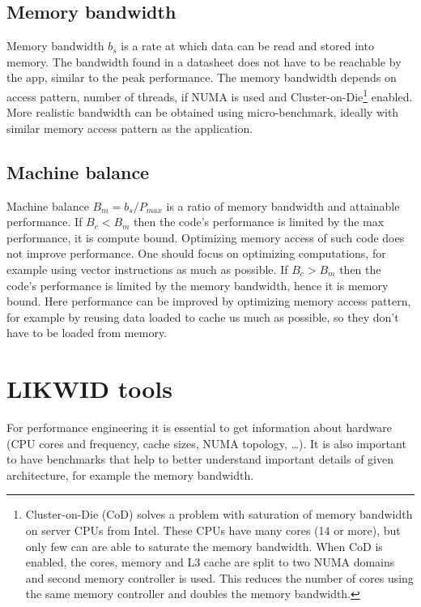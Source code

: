 {\subsection*{Memory bandwidth}

Memory bandwidth $b_s$ is a rate at which data can be read and stored into memory.
The bandwidth found in a datasheet does not have to be reachable by the app, similar to the peak performance.
The memory bandwidth depends on access pattern, number of threads, if NUMA is used and Cluster-on-Die\footnote{Cluster-on-Die (CoD) solves a problem with saturation of memory bandwidth on server CPUs from Intel. These CPUs have many cores (14 or more), but only few can are able to saturate the memory bandwidth. When CoD is enabled, the cores, memory and L3 cache are split to two NUMA domains and second memory controller is used. This reduces the number of cores using the same memory controller and doubles the memory bandwidth.} enabled.
More realistic bandwidth can be obtained using micro-benchmark, ideally with similar memory access pattern as the application.

\subsection*{Machine balance}

Machine balance $B_m = b_s / P_{max}$ is a ratio of memory bandwidth and attainable performance.
If $B_c < B_m$ then the code’s performance is limited by the max performance, it is compute bound. Optimizing memory access of such code does not improve performance. One should focus on optimizing computations, for example using vector instructions as much as possible.
If $B_c > B_m$ then the code’s performance is limited by the memory bandwidth, hence it is memory bound. Here performance can be improved by optimizing memory access pattern, for example by reusing data loaded to cache us much as possible, so they don't have to be loaded from memory.

\section{LIKWID tools}

For performance engineering it is essential to get information about hardware (CPU cores and frequency, cache sizes, NUMA topology, \dots). It is also important to have benchmarks that help to better understand important details of given architecture, for example the memory bandwidth.

}
